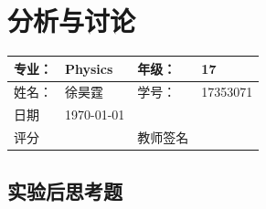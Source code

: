 \documentclass[11pt,a4paper]{ctexart}
\begin{document}
\section{分析与讨论}
\begin{tabular}{|p{7em}|p{7em}|p{7em}|p{7em}|}
	\hline 
	专业：     &Physics       &年级：      & 17     \\
	\hline
	姓名：& 徐昊霆 &学号：&17353071  \\
	\hline
	日期&  \today              & &  \\
	\hline	
	评分 & & 教师签名 & \\
	\hline
\end{tabular}


\subsection{实验后思考题}



\end{document}
